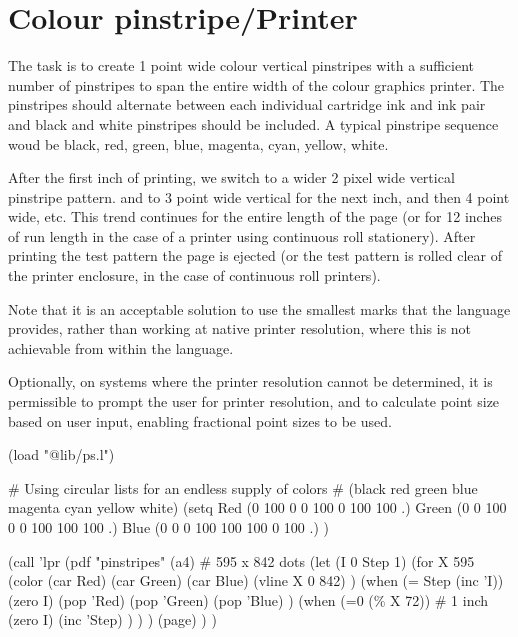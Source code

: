 \pagebreak{}
\section*{Colour pinstripe/Printer}


The task is to create 1 point wide colour vertical pinstripes with a
sufficient number of pinstripes to span the entire width of the colour
graphics printer. The pinstripes should alternate between each
individual cartridge ink and ink pair and black and white pinstripes
should be included. A typical pinstripe sequence woud be black, red,
green, blue, magenta, cyan, yellow, white.

After the first inch of printing, we switch to a wider 2 pixel wide
vertical pinstripe pattern. and to 3 point wide vertical for the next
inch, and then 4 point wide, etc. This trend continues for the entire
length of the page (or for 12 inches of run length in the case of a
printer using continuous roll stationery). After printing the test
pattern the page is ejected (or the test pattern is rolled clear of the
printer enclosure, in the case of continuous roll printers).

Note that it is an acceptable solution to use the smallest marks that
the language provides, rather than working at native printer resolution,
where this is not achievable from within the language.

Optionally, on systems where the printer resolution cannot be
determined, it is permissible to prompt the user for printer resolution,
and to calculate point size based on user input, enabling fractional
point sizes to be used.



\begin{wideverbatim}

(load "@lib/ps.l")

# Using circular lists for an endless supply of colors
#      (black  red  green blue magenta cyan yellow white)
(setq
   Red   (0    100    0     0    100    0    100   100 .)
   Green (0     0    100    0     0    100   100   100 .)
   Blue  (0     0     0    100   100   100    0    100 .) )

(call 'lpr
   (pdf "pinstripes"
      (a4)  # 595 x 842 dots
      (let (I 0  Step 1)
         (for X 595
            (color (car Red) (car Green) (car Blue)
               (vline X 0 842) )
            (when (= Step (inc 'I))
               (zero I)
               (pop 'Red)
               (pop 'Green)
               (pop 'Blue) )
            (when (=0 (\% X 72))  # 1 inch
               (zero I)
               (inc 'Step) ) ) )
      (page) ) )

\end{wideverbatim}

